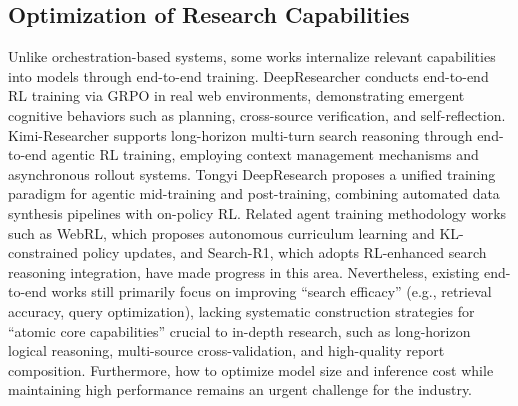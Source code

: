 \documentclass{huawei}
\begin{document}
\subsection{Optimization of Research Capabilities}
Unlike orchestration-based systems, some works internalize relevant capabilities into models through end-to-end training. DeepResearcher conducts end-to-end RL training via GRPO in real web environments, demonstrating emergent cognitive behaviors such as planning, cross-source verification, and self-reflection. Kimi-Researcher supports long-horizon multi-turn search reasoning through end-to-end agentic RL training, employing context management mechanisms and asynchronous rollout systems. Tongyi DeepResearch proposes a unified training paradigm for agentic mid-training and post-training, combining automated data synthesis pipelines with on-policy RL. Related agent training methodology works such as WebRL, which proposes autonomous curriculum learning and KL-constrained policy updates, and Search-R1, which adopts RL-enhanced search reasoning integration, have made progress in this area.
Nevertheless, existing end-to-end works still primarily focus on improving “search efficacy” (e.g., retrieval accuracy, query optimization), lacking systematic construction strategies for “atomic core capabilities” crucial to in-depth research, such as long-horizon logical reasoning, multi-source cross-validation, and high-quality report composition.
Furthermore, how to optimize model size and inference cost while maintaining high performance remains an urgent challenge for the industry.
\end{document}
